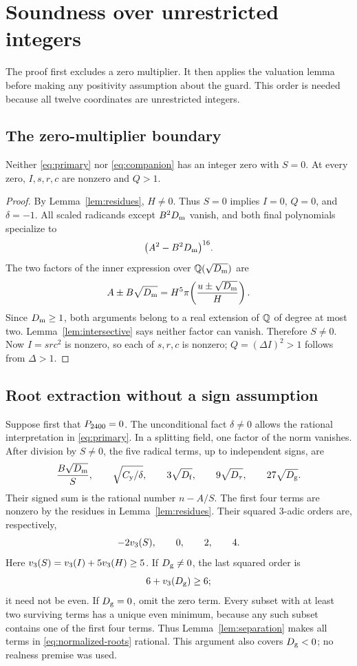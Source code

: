 \section{Soundness over unrestricted integers}\label{sec:soundness}

The proof first excludes a zero multiplier. It then applies the valuation
lemma before making any positivity assumption about the guard. This order
is needed because all twelve coordinates are unrestricted integers.

\subsection{The zero-multiplier boundary}

\begin{lemma}\label{lem:nonzero-scale}
Neither \eqref{eq:primary} nor \eqref{eq:companion} has an integer zero
with $S=0$. At every zero, $I,s,r,c$ are nonzero and $Q>1$.
\end{lemma}
\begin{proof}
By Lemma~\ref{lem:residues}, $H\ne0$. Thus $S=0$ implies $I=0$,
$Q=0$, and $\delta=-1$. All scaled radicands except $B^2D_{\mathrm m}$ vanish,
and both final polynomials specialize to
\[
 \bigl(A^2-B^2D_{\mathrm m}\bigr)^{16}.
\]
The two factors of the inner expression over $\mathbb Q(\sqrt{D_{\mathrm m}})$ are
\[
 A\pm B\sqrt{D_{\mathrm m}}
 =H^5\pi\!\left(\frac{u\pm\sqrt{D_{\mathrm m}}}{H}\right).
\]
Since $D_{\mathrm m}\ge1$, both arguments belong to a real extension of $\mathbb Q$ of
degree at most two. Lemma~\ref{lem:intersective} says neither factor can
vanish. Therefore $S\ne0$. Now $I=src^2$ is nonzero, so each of
$s,r,c$ is nonzero; $Q=(\Delta I)^2>1$ follows from $\Delta>1$.
\end{proof}

\subsection{Root extraction without a sign assumption}

Suppose first that $P_{2400}=0$. The unconditional fact $\delta\ne0$
allows the rational interpretation in \eqref{eq:primary}. In a splitting
field, one factor of the norm vanishes. After division by $S\ne0$,
the five radical terms, up to independent signs, are
\begin{equation}\label{eq:normalized-roots}
 \frac{B\sqrt{D_{\mathrm m}}}{S},\qquad
 \sqrt{C_{\mathrm y}/\delta},\qquad
 3\sqrt{D_{\mathrm f}},\qquad9\sqrt{D_{\tau}},\qquad27\sqrt{D_{\mathrm g}}.
\end{equation}
Their signed sum is the rational number $n-A/S$. The first four terms
are nonzero by the residues in Lemma~\ref{lem:residues}. Their squared
$3$-adic orders are, respectively,
\begin{equation}\label{eq:orders}
 -2v_3(S),\qquad0,\qquad2,\qquad4.
\end{equation}
Here $v_3(S)=v_3(I)+5v_3(H)\ge5$. If $D_{\mathrm g}\ne0$, the last
squared order is
\[
 6+v_3(D_{\mathrm g})\ge6;
\]
it need not be even. If $D_{\mathrm g}=0$, omit the zero term. Every subset
with at least two surviving terms has a unique even minimum, because
any such subset contains one of the first four terms. Thus
Lemma~\ref{lem:separation} makes all terms in
\eqref{eq:normalized-roots} rational. This argument also covers
$D_{\mathrm g}<0$; no realness premise was used.

